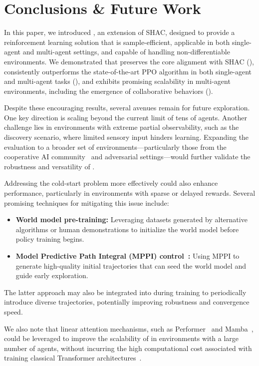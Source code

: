 
\section{Conclusions \& Future Work}\label{sect:conclusion}

In this paper, we introduced \fname{}, an extension of SHAC, designed to provide a reinforcement learning solution that is sample-efficient, applicable in both single-agent and multi-agent settings, and capable of handling non-differentiable environments. We demonstrated that \fname{} preserves the core alignment with SHAC (), consistently outperforms the state-of-the-art PPO algorithm in both single-agent and multi-agent tasks (), and exhibits promising scalability in multi-agent environments, including the emergence of collaborative behaviors ().

Despite these encouraging results, several avenues remain for future exploration. One key direction is scaling beyond the current limit of tens of agents. Another challenge lies in environments with extreme partial observability, such as the discovery scenario, where limited sensory input hinders learning. Expanding the evaluation to a broader set of environments—particularly those from the cooperative AI community~\cite{DBLP:journals/corr/abs-2211-13746} and adversarial settings—would further validate the robustness and versatility of \fname{}.

Addressing the cold-start problem more effectively could also enhance performance, particularly in environments with sparse or delayed rewards. Several promising techniques for mitigating this issue include:

\begin{itemize}
    \item \textbf{World model pre-training:} Leveraging datasets generated by alternative algorithms or human demonstrations to initialize the world model before policy training begins.
    \item \textbf{Model Predictive Path Integral (MPPI) control~\cite{Alvarez24}:} Using MPPI to generate high-quality initial trajectories that can seed the world model and guide early exploration.
\end{itemize}

The latter approach may also be integrated into \fname{} during training to periodically introduce diverse trajectories, potentially improving robustness and convergence speed.

We also note that linear attention mechanisms, such as Performer~\cite{Choromanski20} and Mamba~\cite{Gu23}, could be leveraged to improve the scalability of \fname{} in environments with a large number of agents, without incurring the high computational cost associated with training classical Transformer architectures~\cite{Vaswani17}.

